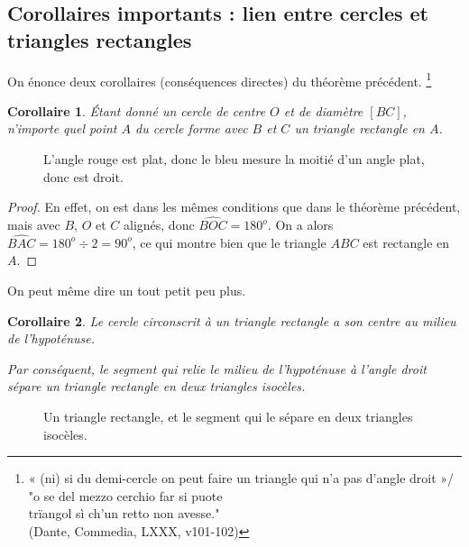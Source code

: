 \documentclass[12 pt]{article}
\theoremstyle{plain}
\newcounter{n}
\numberwithin{n}{section}
\newtheorem*{cor}{Corollaire}
\begin{document}
\subsection{Corollaires importants : lien entre cercles et triangles rectangles}
On énonce deux corollaires (conséquences directes) du théorème précédent. \footnote{« (ni) si du demi-cercle on peut faire un triangle qui n'a pas d'angle droit »/ \\
"o se del mezzo cerchio far si puote\\ trïangol sì ch'un retto non avesse."\\ 
(Dante, Commedia, LXXX, v101-102) }

\begin{cor}
Étant donné un cercle de centre $O$ et de diamètre $[BC]$, n'importe quel point $A$ du cercle 
forme avec $B$ et $C$ un triangle rectangle en $A$. 
\end{cor}

\begin{figure}[H]\center
{}\caption{L'angle rouge est plat, donc le bleu mesure la moitié d'un angle plat, donc est droit.}
\end{figure}
\begin{proof}
En effet, on est dans les mêmes conditions que dans le théorème précédent, mais avec $B$, $O$ et $C$ alignés, donc 
$\widehat{BOC}= 180^o$. On a alors $\widehat{BAC}= 180^o\div2 = 90^o$, ce qui montre bien que le triangle 
$ABC$ est rectangle en $A$. 
\end{proof}
On peut même dire un tout petit peu plus.
\begin{cor}
Le cercle circonscrit à un triangle rectangle a son centre au milieu de l'hypoténuse. 

Par conséquent, le segment qui relie le milieu de l'hypoténuse à l'angle droit sépare un triangle rectangle en deux triangles isocèles.
\end{cor}\begin{figure}[H]\center
{}\caption{Un triangle rectangle, et le segment qui le sépare en deux triangles isocèles.}
\end{figure}
\end{document}
